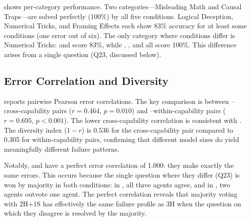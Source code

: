  shows per-category performance.
Two categories---Misleading Math and Causal Traps---are solved perfectly (100\%)
by all five conditions.
Logical Deception, Numerical Tricks, and Framing Effects each
show 83\% accuracy for at least some conditions (one error out of six).
The only category where conditions differ is Numerical Tricks:
\singlesonnet and \debate score 83\%, while \singlehaiku, \homoghaiku, and \hetero
all score 100\%.
This difference arises from a single question (Q23, discussed below).

\begin{table}[t]
\centering
\caption{Per-category accuracy (\%) across five conditions. All categories have 6 questions.
Bold indicates category-best. Identical scores share the formatting.}
\label{tab:category_results}
\end{table}

\subsection{Error Correlation and Diversity}

 reports pairwise Pearson error correlations.
The key comparison is between \haiku--\sonnet cross-capability pairs ($r{=}0.464$, $p{=}0.010$)
and \haiku--\haiku within-capability pairs ($r{=}0.695$, $p{<}0.001$).
The lower cross-capability correlation is consistent with \Htwo.
The diversity index ($1-r$) is 0.536 for the cross-capability pair
compared to 0.305 for within-capability pairs, confirming that different
model sizes do yield meaningfully different failure patterns.

Notably, \homoghaiku and \hetero have a perfect error correlation of 1.000:
they make exactly the same errors. This occurs because the single question
where they differ (Q23) is won by \haiku majority in both conditions:
in \homoghaiku, all three \haiku agents agree, and in \hetero,
two \haiku agents outvote one \sonnet agent.
The perfect correlation reveals that majority voting with 2H+1S has effectively
the same failure profile as 3H when the question on which they disagree
is resolved by the \haiku majority.


